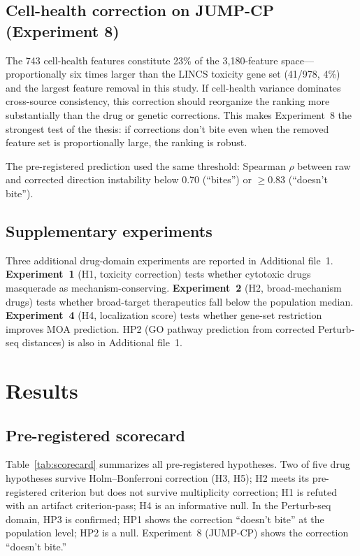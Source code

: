 \documentclass[11pt]{article}
\begin{document}
\subsection{Cell-health correction on JUMP-CP (Experiment 8)}

The 743 cell-health features constitute 23\% of the 3{,}180-feature
space---proportionally six times larger than the LINCS toxicity gene set
(41/978, 4\%) and the largest feature removal in this study. If cell-health
variance dominates cross-source consistency, this correction should
reorganize the ranking more substantially than the drug or genetic
corrections. This makes Experiment~8 the strongest test of the thesis:
if corrections don't bite even when the removed feature set is
proportionally large, the ranking is robust.

The pre-registered prediction used the same threshold: Spearman $\rho$
between raw and corrected direction instability below 0.70 (``bites'')
or $\geq 0.83$ (``doesn't bite'').

\subsection{Supplementary experiments}

Three additional drug-domain experiments are reported in Additional
file~1. \textbf{Experiment~1}
(H1, toxicity correction) tests whether cytotoxic drugs masquerade as
mechanism-conserving. \textbf{Experiment~2} (H2, broad-mechanism drugs)
tests whether broad-target therapeutics fall below the population median.
\textbf{Experiment~4} (H4, localization score) tests whether gene-set
restriction improves MOA prediction. HP2 (GO pathway prediction from
corrected Perturb-seq distances) is also in Additional file~1.

\section{Results}

\subsection{Pre-registered scorecard}

Table~\ref{tab:scorecard} summarizes all pre-registered hypotheses.
Two of five drug hypotheses survive Holm--Bonferroni correction (H3, H5);
H2 meets its pre-registered criterion but does not survive multiplicity
correction; H1 is refuted with an artifact criterion-pass; H4 is an
informative null.
In the Perturb-seq domain, HP3 is confirmed; HP1 shows the correction
``doesn't bite'' at the population level; HP2 is a null. Experiment~8
(JUMP-CP) shows the correction ``doesn't bite.''
\end{document}
